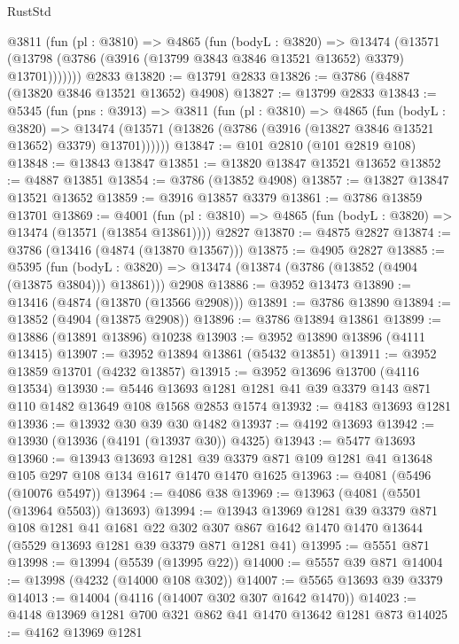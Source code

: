 \begin{lexlean}{RustStd}
\begin{coremodule}
      @3811
        (fun (pl : @3810) =>
        @4865
          (fun (bodyL : @3820) =>
          @13474
            (@13571 (@13798 (@3786 (@3916 (@13799 @3843 @3846 @13521 @13652) @3379) @13701)))))))
    @2833
@13820 := @13791 @2833
@13826 := @3786 (@4887 (@13820 @3846 @13521 @13652) @4908)
@13827 := @13799 @2833
@13843 := @5345
    (fun (pns : @3913) =>
    @3811
      (fun (pl : @3810) =>
      @4865
        (fun (bodyL : @3820) =>
        @13474 (@13571 (@13826 (@3786 (@3916 (@13827 @3846 @13521 @13652) @3379) @13701))))))
@13847 := @101 @2810 (@101 @2819 @108)
@13848 := @13843 @13847
@13851 := @13820 @13847 @13521 @13652
@13852 := @4887 @13851
@13854 := @3786 (@13852 @4908)
@13857 := @13827 @13847 @13521 @13652
@13859 := @3916 @13857 @3379
@13861 := @3786 @13859 @13701
@13869 := @4001
    (fun (pl : @3810) => @4865 (fun (bodyL : @3820) => @13474 (@13571 (@13854 @13861))))
    @2827
@13870 := @4875 @2827
@13874 := @3786 (@13416 (@4874 (@13870 @13567)))
@13875 := @4905 @2827
@13885 := @5395
    (fun (bodyL : @3820) => @13474 (@13874 (@3786 (@13852 (@4904 (@13875 @3804))) @13861)))
    @2908
@13886 := @3952 @13473
@13890 := @13416 (@4874 (@13870 (@13566 @2908)))
@13891 := @3786 @13890
@13894 := @13852 (@4904 (@13875 @2908))
@13896 := @3786 @13894 @13861
@13899 := @13886 (@13891 @13896) @10238
@13903 := @3952 @13890 @13896 (@4111 @13415)
@13907 := @3952 @13894 @13861 (@5432 @13851)
@13911 := @3952 @13859 @13701 (@4232 @13857)
@13915 := @3952 @13696 @13700 (@4116 @13534)
@13930 := @5446 @13693 @1281 @1281 @41 @39 @3379 @143 @871 @110 @1482 @13649 @108 @1568 @2853 @1574
@13932 := @4183 @13693 @1281
@13936 := @13932 @30 @39 @30 @1482
@13937 := @4192 @13693
@13942 := @13930 (@13936 (@4191 (@13937 @30)) @4325)
@13943 := @5477 @13693
@13960 := @13943
    @13693
    @1281
    @39
    @3379
    @871
    @109
    @1281
    @41
    @13648
    @105
    @297
    @108
    @134
    @1617
    @1470
    @1470
    @1625
@13963 := @4081 (@5496 (@10076 @5497))
@13964 := @4086 @38
@13969 := @13963 (@4081 (@5501 (@13964 @5503)) @13693)
@13994 := @13943
    @13969
    @1281
    @39
    @3379
    @871
    @108
    @1281
    @41
    @1681
    @22
    @302
    @307
    @867
    @1642
    @1470
    @1470
    @13644
    (@5529 @13693 @1281 @39 @3379 @871 @1281 @41)
@13995 := @5551 @871
@13998 := @13994 (@5539 (@13995 @22))
@14000 := @5557 @39 @871
@14004 := @13998 (@4232 (@14000 @108 @302))
@14007 := @5565 @13693 @39 @3379
@14013 := @14004 (@4116 (@14007 @302 @307 @1642 @1470))
@14023 := @4148 @13969 @1281 @700 @321 @862 @41 @1470 @13642 @1281 @873
@14025 := @4162 @13969 @1281

\end{coremodule}
\end{lexlean}
